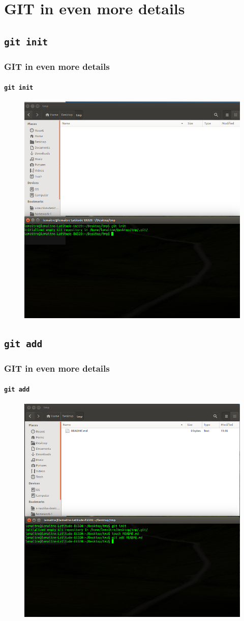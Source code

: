 \documentclass{beamer}
\begin{document}
\section{GIT in even more details}

\subsection{\texttt{git init}}

\begin{frame}
  \frametitle{GIT in even more details}
  \framesubtitle{\texttt{git init}}
  \begin{figure}
      \centering
      \includegraphics[width=.65\textwidth]{./images/workflow/init.png}
    \end{figure}
\end{frame}

\subsection{\texttt{git add}}

\begin{frame}
  \frametitle{GIT in even more details}
  \framesubtitle{\texttt{git add}}
  \begin{figure}
      \centering
      \includegraphics[width=.65\textwidth]{./images/workflow/add.png}
    \end{figure}
\end{frame}
\end{document}
